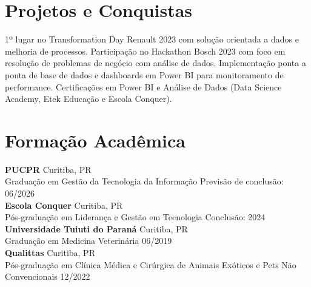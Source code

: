 \documentclass[11pt,a4paper]{article}
\begin{document}
\section{Projetos e Conquistas}

1º lugar no Transformation Day Renault 2023 com solução orientada a dados e melhoria de processos. Participação no Hackathon Bosch 2023 com foco em resolução de problemas de negócio com análise de dados. Implementação ponta a ponta de base de dados e dashboards em Power BI para monitoramento de performance. Certificações em Power BI e Análise de Dados (Data Science Academy, Etek Educação e Escola Conquer).

\section{Formação Acadêmica}

\textbf{PUCPR} \hfill Curitiba, PR\\
Graduação em Gestão da Tecnologia da Informação \hfill Previsão de conclusão: 06/2026\\[6pt]

\textbf{Escola Conquer} \hfill Curitiba, PR\\
Pós-graduação em Liderança e Gestão em Tecnologia \hfill Conclusão: 2024\\[6pt]

\textbf{Universidade Tuiuti do Paraná} \hfill Curitiba, PR\\
Graduação em Medicina Veterinária \hfill 06/2019\\[6pt]

\textbf{Qualittas} \hfill Curitiba, PR\\
Pós-graduação em Clínica Médica e Cirúrgica de Animais Exóticos e Pets Não Convencionais \hfill 12/2022
\end{document}
